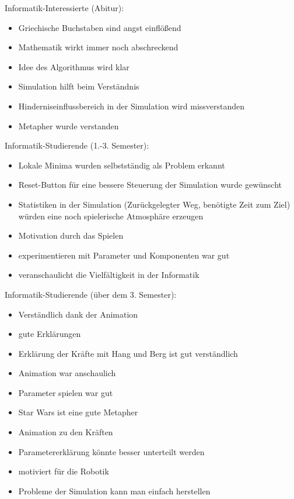 Informatik-Interessierte (Abitur):
\begin{itemize}
	\item Griechische Buchstaben sind angst einflößend
	\item Mathematik wirkt immer noch abschreckend
	\item Idee des Algorithmus wird klar
	\item Simulation hilft beim Verständnis
	\item Hinderniseinflussbereich in der Simulation wird missverstanden
	\item Metapher wurde verstanden
\end{itemize}

Informatik-Studierende (1.-3. Semester):
\begin{itemize}
	\item Lokale Minima wurden selbstständig als Problem erkannt
	\item Reset-Button für eine bessere Steuerung der Simulation wurde gewünscht
	\item Statistiken in der Simulation (Zurückgelegter Weg, benötigte Zeit zum Ziel) würden eine noch spielerische Atmosphäre erzeugen
	\item Motivation durch das Spielen
	\item experimentieren mit Parameter und Komponenten war gut
	\item veranschaulicht die Vielfältigkeit in der Informatik
\end{itemize}

Informatik-Studierende (über dem  3. Semester):
\begin{itemize}
	\item Verständlich dank der Animation
	\item gute Erklärungen
	\item Erklärung der Kräfte mit Hang und Berg ist gut verständlich
	\item Animation war anschaulich
	\item Parameter spielen war gut
	\item Star Wars ist eine gute Metapher
	\item Animation zu den Kräften %
	\item Parametererklärung könnte besser unterteilt werden
	\item motiviert für die Robotik
	\item Probleme der Simulation kann man einfach herstellen
\end{itemize}


